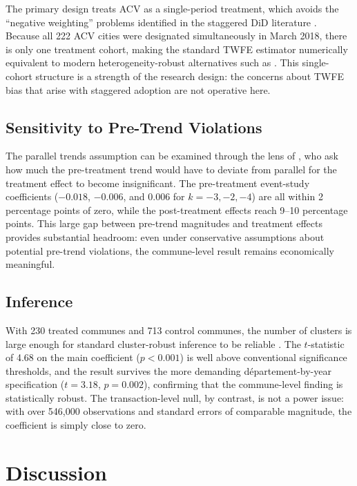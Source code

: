 \documentclass[12pt]{article}
\begin{document}
The primary design treats ACV as a single-period treatment, which avoids the ``negative weighting'' problems identified in the staggered DiD literature \citep{sunabraham2021, borusyak2024revisiting}. Because all 222 ACV cities were designated simultaneously in March 2018, there is only one treatment cohort, making the standard TWFE estimator numerically equivalent to modern heterogeneity-robust alternatives such as \citet{callaway2021difference}. This single-cohort structure is a strength of the research design: the concerns about TWFE bias that arise with staggered adoption are not operative here.

\subsection{Sensitivity to Pre-Trend Violations}

The parallel trends assumption can be examined through the lens of \citet{rambachan2023more}, who ask how much the pre-treatment trend would have to deviate from parallel for the treatment effect to become insignificant. The pre-treatment event-study coefficients ($-0.018$, $-0.006$, and $0.006$ for $k = -3, -2, -4$) are all within 2 percentage points of zero, while the post-treatment effects reach 9--10 percentage points. This large gap between pre-trend magnitudes and treatment effects provides substantial headroom: even under conservative assumptions about potential pre-trend violations, the commune-level result remains economically meaningful.

\subsection{Inference}

With 230 treated communes and 713 control communes, the number of clusters is large enough for standard cluster-robust inference to be reliable \citep{cameron2008bootstrap}. The $t$-statistic of 4.68 on the main coefficient ($p < 0.001$) is well above conventional significance thresholds, and the result survives the more demanding d\'{e}partement-by-year specification ($t = 3.18$, $p = 0.002$), confirming that the commune-level finding is statistically robust. The transaction-level null, by contrast, is not a power issue: with over 546,000 observations and standard errors of comparable magnitude, the coefficient is simply close to zero.




\section{Discussion}
\end{document}
